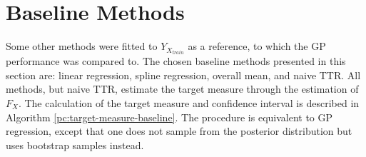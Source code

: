 \section{Baseline Methods}\label{sec:baseline-methods}

Some other methods were fitted to $Y_{X_{train}}$ as a reference, to which
the GP performance was compared to.
The chosen baseline methods presented in this section are: linear regression,
spline regression, overall mean, and naive TTR.
All methods, but naive TTR, estimate the target measure through the estimation of $F_X$.
The calculation of the target measure and confidence interval is described in
Algorithm \ref{pc:target-measure-baseline}.
The procedure is equivalent to GP regression, except that one does not sample from
the posterior distribution but uses bootstrap samples instead.


